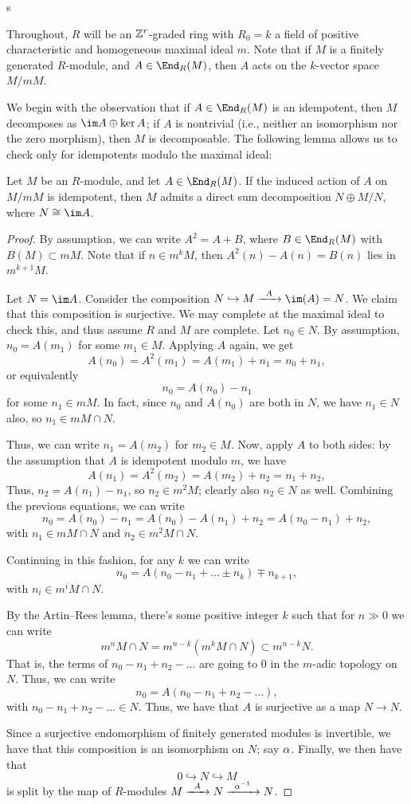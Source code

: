 s\documentclass{article}
\let\inc\hookrightarrow
\numberwithin{equation}{section}
\theoremstyle{theorem}
\numberwithin{thm}{section}
\theoremstyle{definition}
\begin{document}
Throughout, $R$ will be an $\mathbb Z^r$-graded ring with $R_0 = k$ a field of positive characteristic and homogeneous maximal ideal $m$. Note that if $M$ is a finitely generated $R$-module, and $A\in \End_R(M)$, then $A$ acts on the $k$-vector space $M/mM$.

We begin with the observation that if $A\in\End_R(M)$ is an idempotent, then $M$ decomposes as $\im A \oplus \ker A$; if $A$ is nontrivial (i.e., neither an isomorphism nor the zero morphism), then $M$ is decomposable. The following lemma allows us to check only for idempotents modulo the maximal ideal:

\begin{lem}\label{lem:idemp}
  Let $M$ be an $R$-module, and let $A\in\End_R(M)$. If the induced action of $A$ on $M/mM$ is idempotent, then $M$ admits a direct sum decomposition $N\oplus M/N$, where $N\cong \im A$.
\end{lem}
\begin{proof}
  By assumption, we can write $A^2 = A + B$, where $B\in\End_R(M)$ with $B(M)\subset mM$.
  Note that if $n \in m^kM$, then $A^2(n) - A(n) = B(n)$  lies in $m^{k+1}M$.

  Let $N = \im A$. Consider the composition $N\inc M \xra{A} \im(A) = N$. We claim that this composition is surjective. We may complete at the maximal ideal to check this, and thus assume $R$ and $M$ are complete. Let $n_0\in N$. By assumption, $n_0=A(m_1)$ for some $m_1\in M$. Applying $A$ again, we get
  \[ A(n_0) = A^2(m_1) = A(m_1) + n_1 = n_0 + n_1, \]
  or equivalently
  \[ n_0 = A(n_0) - n_1 \]
  for some $n_1\in mM$. In fact, since $n_0$ and $A(n_0)$ are both in $N$, we have $n_1\in N$ also, so $n_1\in mM\cap N$.

  Thus, we can write $n_1 = A(m_2)$ for $m_2\in M$.
  Now, apply $A$ to both sides: by the assumption that $A$ is idempotent modulo $m$, we have
  \[ A(n_1)=A^2(m_2) = A(m_2) + n_2 = n_1+n_2, \]
  Thus, $n_2=A(n_1)-n_1$, so $n_2\in m^2M$; clearly also $n_2\in N$ as well.
  Combining the previous equations, we can write
  \[ n_0 = A(n_0) - n_1 = A(n_0) - A(n_1) + n_2 = A(n_0 - n_1) + n_2, \]
  with $n_1\in mM\cap N$ and $n_2\in m^2M\cap N$.

  Continuing in this fashion, for any $k$ we can write
  \[ n_0=A(n_0-n_1+\dots \pm n_k) \mp n_{k+1}, \]
  with $n_i \in m^i M\cap N$.

  By the Artin--Rees lemma, there's some positive integer $k$ such that for $n\gg0$ we can write
  \[ m^n M\cap N = m^{n-k} ( m^kM\cap N)\subset m^{n-k} N. \]
  That is, the terms of $n_0-n_1+n_2-\dots$ are going to 0 in the $m$-adic topology on $N$. Thus, we can write
  \[ n_0=A(n_0-n_1+n_2-\dots), \]
  with $n_0-n_1+n_2-\dots\in N$. Thus, we have that $A$ is surjective as a map $N\to N$.

  Since a surjective endomorphism of finitely generated modules is invertible, we have that this composition is an isomorphism on $N$; say $\alpha$.
  Finally, we then have that
  \[ 0 \inc N \inc M \]
  is split by the map of $R$-modules $M\xra A N\xra{\a\inv} N$.
\end{proof}
\end{document}
